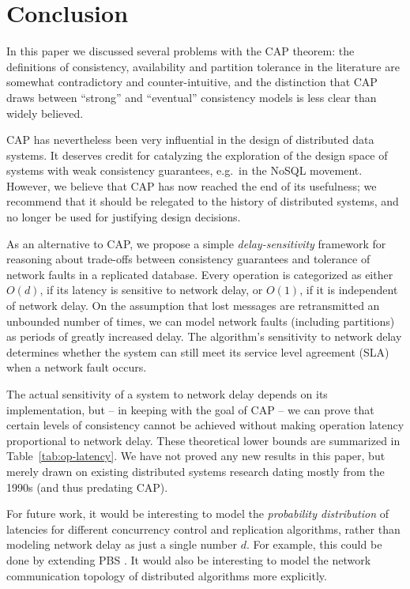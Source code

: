 \documentclass[fleqn,12pt,lineno]{wlpeerj} %
\begin{document}
\section{Conclusion}

In this paper we discussed several problems with the CAP theorem: the definitions of consistency,
availability and partition tolerance in the literature are somewhat contradictory and
counter-intuitive, and the distinction that CAP draws between ``strong'' and ``eventual''
consistency models is less clear than widely believed.

CAP has nevertheless been very influential in the design of distributed data systems. It deserves
credit for catalyzing the exploration of the design space of systems with weak consistency
guarantees, e.g.\ in the NoSQL movement. However, we believe that CAP has now reached the end of its
usefulness; we recommend that it should be relegated to the history of distributed systems, and no
longer be used for justifying design decisions.

As an alternative to CAP, we propose a simple \emph{delay-sensitivity} framework for reasoning about
trade-offs between consistency guarantees and tolerance of network faults in a replicated database.
Every operation is categorized as either $O(d)$, if its latency is sensitive to network delay, or
$O(1)$, if it is independent of network delay. On the assumption that lost messages are
retransmitted an unbounded number of times, we can model network faults (including partitions) as
periods of greatly increased delay. The algorithm's sensitivity to network delay determines whether
the system can still meet its service level agreement (SLA) when a network fault occurs.

The actual sensitivity of a system to network delay depends on its implementation, but -- in keeping
with the goal of CAP -- we can prove that certain levels of consistency cannot be achieved without
making operation latency proportional to network delay. These theoretical lower bounds are
summarized in Table~\ref{tab:op-latency}. We have not proved any new results in this paper, but
merely drawn on existing distributed systems research dating mostly from the 1990s (and thus
predating CAP).

For future work, it would be interesting to model the \emph{probability distribution} of latencies
for different concurrency control and replication algorithms, rather than modeling network delay as
just a single number $d$. For example, this could be done by extending PBS \citep{Bailis2012to}.
It would also be interesting to model the network communication topology of distributed algorithms
more explicitly.
\end{document}

